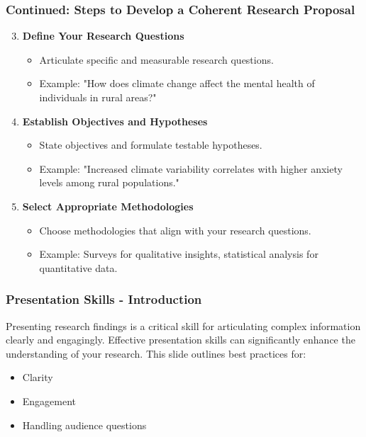 \documentclass[aspectratio=169]{beamer}
\begin{document}
\begin{frame}[fragile]
    \frametitle{Continued: Steps to Develop a Coherent Research Proposal}
    \begin{enumerate}
        \setcounter{enumi}{2} %
        \item \textbf{Define Your Research Questions}
            \begin{itemize}
                \item Articulate specific and measurable research questions.
                \item Example: "How does climate change affect the mental health of individuals in rural areas?"
            \end{itemize}

        \item \textbf{Establish Objectives and Hypotheses}
            \begin{itemize}
                \item State objectives and formulate testable hypotheses.
                \item Example: "Increased climate variability correlates with higher anxiety levels among rural populations."
            \end{itemize}

        \item \textbf{Select Appropriate Methodologies}
            \begin{itemize}
                \item Choose methodologies that align with your research questions.
                \item Example: Surveys for qualitative insights, statistical analysis for quantitative data.
            \end{itemize}
    \end{enumerate}
\end{frame}

\begin{frame}[fragile]
    \frametitle{Presentation Skills - Introduction}
    Presenting research findings is a critical skill for articulating complex information clearly and engagingly. Effective presentation skills can significantly enhance the understanding of your research. This slide outlines best practices for:
    \begin{itemize}
        \item Clarity
        \item Engagement
        \item Handling audience questions
    \end{itemize}
\end{frame}
\end{document}
